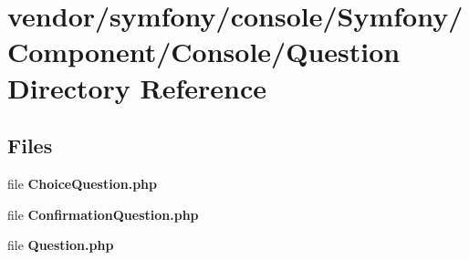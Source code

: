 \section{vendor/symfony/console/\+Symfony/\+Component/\+Console/\+Question Directory Reference}
\label{dir_3b34a56a9951c6794b0fe30342e124a3}
\subsection*{Files}
\begin{DoxyCompactItemize}
\item 
file {\bf Choice\+Question.\+php}
\item 
file {\bf Confirmation\+Question.\+php}
\item 
file {\bf Question.\+php}
\end{DoxyCompactItemize}
